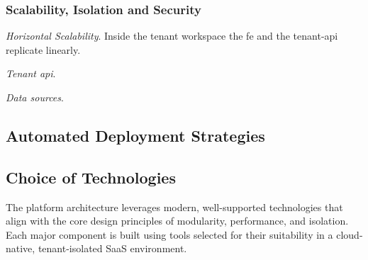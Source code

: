 \documentclass[11pt, a4paper, oneside, listof=totoc]{scrartcl}
\begin{document}
            \subsubsection{Scalability, Isolation and Security}\label{scalabilityIsolationSecurity}
                \begin{enumerate}[label={[\arabic*]:},
                    ref=Challenge~\arabic*,
                    leftmargin=*,
                    itemsep=0.6\baselineskip]

                    \item\label{chal:architectureScalability}
                        \textit{Horizontal Scalability}.
                        Inside the tenant workspace the \gls{fe} and the tenant-\gls{api} replicate
                        linearly.

                    \item\label{chal:architectureIsolation}
                        \textit{Tenant \gls{api}}.
                        

                    \item\label{chal:architectureSecurity}
                        \textit{Data sources}.
                        
                \end{enumerate}
                
                \cleardoublepage

        \subsection{Automated Deployment Strategies}\label{subsec:deploymentStrategies}
            \cleardoublepage

        \subsection{Choice of Technologies}\label{subsec:technologies}
            The platform architecture leverages modern, well-supported technologies that align with
            the core design principles of modularity, performance, and isolation.
            Each major component is built using tools selected for their suitability in a
            cloud-native, tenant-isolated SaaS environment.
\end{document}
